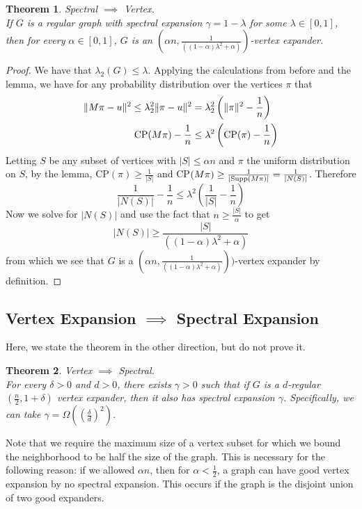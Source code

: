 \documentclass[11pt]{article}
\newtheorem{theorem}{Theorem}[section]
\theoremstyle{definition}
\theoremstyle{definition}
\theoremstyle{definition}
\newcommand{\txt}[1]
{\textnormal{#1}}
\begin{document}
\begin{theorem} Spectral $\implies$ Vertex. \\
If $G$ is a regular graph with spectral expansion $\gamma = 1 - \lambda$ for some $\lambda \in [0, 1]$, then for every $\alpha \in [0, 1]$, $G$ is an $(\alpha n, \frac{1}{\left((1 - \alpha)\lambda^2 + \alpha\right)})$-vertex expander.
\end{theorem}
\begin{proof}
We have that $\lambda_2(G) \leq \lambda$. Applying the calculations from before and the lemma, we have for any probability distribution over the vertices $\pi$ that 
\begin{align}
\begin{split}
\|M\pi - u\|^2 \leq \lambda_2^2\|\pi - u\|^2 &= \lambda_2^2\left(\|\pi\|^2 - \frac{1}{n}\right)
\\
\txt{CP}(M\pi) - \frac{1}{n} &\leq \lambda^2\left(\txt{CP}(\pi) - \frac{1}{n}\right)
\end{split}
\end{align}
Letting $S$ be any subset of vertices with $|S| \leq \alpha n$ and $\pi$ the uniform distribution on $S$, by the lemma, CP$(\pi) \geq \frac{1}{|S|}$ and CP$(M\pi) \geq \frac{1}{|\txt{Supp}(M\pi)|} = \frac{1}{|N(S)|}$. Therefore 
\[
\frac{1}{|N(S)|} - \frac{1}{n} \leq \lambda^2\left(\frac{1}{|S|} - \frac{1}{n}\right)
\]
Now we solve for $|N(S)|$ and use the fact that $n \geq \frac{|S|}{\alpha}$ to get 
\[
|N(S)| \geq \frac{|S|}{\left((1 - \alpha)\lambda^2 + \alpha\right)}
\] 
from which we see that $G$ is a $(\alpha n, \frac{1}{\left((1 - \alpha)\lambda^2 + \alpha\right)}))$-vertex expander by definition.
\end{proof}

\subsection{Vertex Expansion $\implies$ Spectral Expansion}

Here, we state the theorem in the other direction, but do not prove it.
\begin{theorem} Vertex $\implies$ Spectral. \\
For every $\delta > 0$ and $d > 0$, there exists $\gamma > 0$ such that if $G$
is a $d$-regular $(\frac{n}{2}, 1 + \delta)$ vertex expander, then it also has
spectral expansion $\gamma$. Specifically, we can take $\gamma = \Omega\left((\frac{\delta}{d})^2\right)$. 
\end{theorem}
Note that we require the maximum size of a vertex subset for which we bound the neighborhood to be half the size of the graph. This is necessary for the following reason: if we allowed $\alpha n$, then for $\alpha < \frac{1}{2}$, a graph can have good vertex expansion by no spectral expansion. This occurs if the graph is the disjoint union of two good expanders. 
\end{document}
